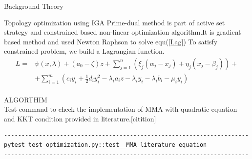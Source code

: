 \documentclass[a4paper,12pt,times]{article}
\begin{document}
\begin{section}{Background Theory}
\begin{subsection}{Topology optimization using IGA}
Prime-dual method is part of active set strategy and constrained based non-linear optimization algorithm.It is gradient based method and used Newton Raphson to solve equ(\ref{Lag})
To satisfy constrained problem, we build a Lagrangian function.
\begin{equation}\label{Lag}
\begin{aligned}
L=& \psi(x, \lambda)+\left(a_{0}-\zeta\right) z+\sum_{j=1}^{n}\left(\xi_{j}\left(\alpha_{j}-x_{j}\right)+\eta_{j}\left(x_{j}-\beta_{j}\right)\right)+\\
&+\sum_{i=1}^{m}\left(c_{i} y_{i}+\frac{1}{2} d_{i} y_{i}^{2}-\lambda_{i} a_{i} z-\lambda_{i} y_{i}-\lambda_{i} b_{i}-\mu_{i} y_{i}\right)
\end{aligned}
\end{equation}\\
ALGORTHIM \\


Test command to check the implementation of MMA with quadratic equation and KKT condition provided in literature.[citition]
\begin{verbatim}
----------------------------------------------------------------------
pytest test_optimization.py::test__MMA_literature_equation
----------------------------------------------------------------------
\end{verbatim}

\end{subsection}
\end{section}
\end{document}
